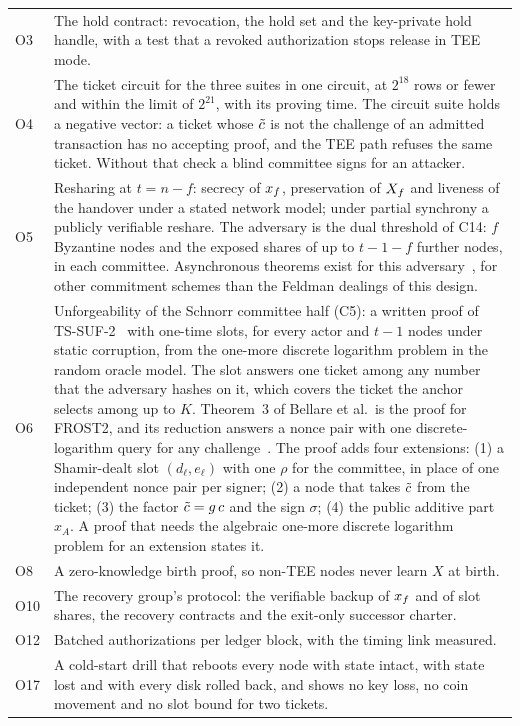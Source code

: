 {\begin{longtable}{@{}>{\raggedright\arraybackslash}p{0.8cm}>{\raggedright\arraybackslash}p{13.5cm}@{}}
O3 & The hold contract: revocation, the hold set and the key-private hold handle, with a test that a revoked authorization stops release in TEE mode. \\
O4 & The ticket circuit for the three suites in one circuit, at $2^{18}$ rows or fewer and within the limit of $2^{21}$, with its proving time. The circuit suite holds a negative vector: a ticket whose $\tilde{c}$ is not the challenge of an admitted transaction has no accepting proof, and the TEE path refuses the same ticket. Without that check a blind committee signs for an attacker. \\
O5 & Resharing at $t = n - f$: secrecy of $x_{f}$, preservation of $X_{f}$ and liveness of the handover under a stated network model; under partial synchrony a publicly verifiable reshare. The adversary is the dual threshold of C14: $f$ Byzantine nodes and the exposed shares of up to $t - 1 - f$ further nodes, in each committee. Asynchronous theorems exist for this adversary~\cite{YXXM23,DXKR23}, for other commitment schemes than the Feldman dealings of this design. \\
O6 & Unforgeability of the Schnorr committee half (C5): a written proof of TS-SUF-2~\cite{BTA22} with one-time slots, for every actor and $t - 1$ nodes under static corruption, from the one-more discrete logarithm problem in the random oracle model. The slot answers one ticket among any number that the adversary hashes on it, which covers the ticket the anchor selects among up to $K$. Theorem~3 of Bellare et al.\ is the proof for FROST2, and its reduction answers a nonce pair with one discrete-logarithm query for any challenge~\cite[Section~1.2]{Chen25}. The proof adds four extensions: (1) a Shamir-dealt slot $(d_\ell, e_\ell)$ with one $\rho$ for the committee, in place of one independent nonce pair per signer; (2) a node that takes $\tilde{c}$ from the ticket; (3) the factor $\tilde{c} = g\,c$ and the sign $\sigma$; (4) the public additive part $x_A$. A proof that needs the algebraic one-more discrete logarithm problem for an extension states it. \\
O8 & A zero-knowledge birth proof, so non-TEE nodes never learn $X$ at birth. \\
O10 & The recovery group's protocol: the verifiable backup of $x_{f}$ and of slot shares, the recovery contracts and the exit-only successor charter. \\
O12 & Batched authorizations per ledger block, with the timing link measured. \\
O17 & A cold-start drill that reboots every node with state intact, with state lost and with every disk rolled back, and shows no key loss, no coin movement and no slot bound for two tickets. \\

\end{longtable}}
